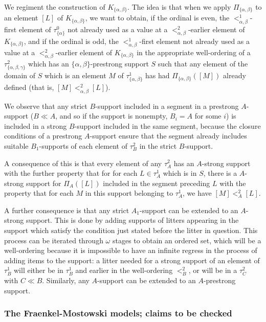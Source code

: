 \documentclass[12pt]{article}
\begin{document}
We regiment the construction of $K_{\{\alpha,\beta\}}$.  The idea is that when we apply $\Pi_{\{\alpha,\beta\}}$ to an  element $[L]$ of $K_{\{\alpha,\beta\}}$, we want to obtain, if the ordinal is even, the $<^1_{\alpha,\beta}$-first element of $\tau^0_{\{\alpha\}}$ not already used as a value at  a $<^2_{\alpha,\beta}$-earlier element of $K_{\{\alpha,\beta\}}$, and if the ordinal is odd,
the $<^1_{\alpha,\beta}$-first element not already used as a value at  a $<^2_{\alpha,\beta}$-earlier element of $K_{\{\alpha,\beta\}}$ in the appropriate well-ordering of a $\tau^2_{\{\alpha,\beta,\gamma\}}$ which has an $\{\alpha,\beta\}$-prestrong support $S$ such that any element of the domain of $S$ which is an element $M$ of $\tau^1_{\{\alpha,\beta\}}$ 
has had $\Pi_{\{\alpha,\beta\}}([M])$ already defined (that is, $[M] <^2_{\alpha,\beta} [L]$).

We observe that any strict $B$-support included in a segment in a prestrong $A$-support ($B \ll A$, and so if the support is nonempty, $B_i=A$ for some $i$) is included in a strong $B$-support included in the same segment, because the closure conditions of
a prestrong $A$-support ensure that the segment already includes suitable $B_1$-supports of each element of $\tau^2_B$ in the strict $B$-support.

A consequence of this is that every element of any $\tau^2_A$ has an $A$-strong support with the further property that for for each $L \in \tau^1_A$ which is in $S$,
there is a $A$-strong support for $\Pi_A([L])$ included in the segment  preceding $L$ with the property that for each $M$ in this support belonging to $\tau^1_A$, we have $[M]<^2_A[L]$.

A further consequence is that any strict $A_1$-support  can be extended to an $A$-strong support.  This is done by adding supports of litters appearing in the support which
satisfy the condition just stated before the litter in question.  This process can be iterated through $\omega$ stages to obtain an ordered set, which will be a well-ordering because it is impossible to have an infinite regress in the process of adding items to the support:  a litter  needed for a strong support of an element of $\tau^1_B$ will either be in $\tau^1_B$ and earlier in the well-ordering $<^2_B$, or will be in a $\tau^2_C$ with $C\ll B$.  Similarly, any $A$-support can be extended to an $A$-prestrong support.

\newpage

\subsubsection{The Fraenkel-Mostowski models; claims to be checked}
\end{document}
